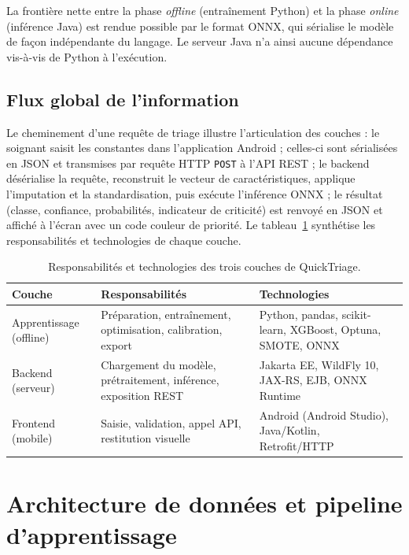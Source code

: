 \begin{infobox}
La frontière nette entre la phase \textit{offline} (entraînement Python) et la phase
\textit{online} (inférence Java) est rendue possible par le format ONNX, qui sérialise le
modèle de façon indépendante du langage. Le serveur Java n'a ainsi aucune dépendance vis-à-vis
de Python à l'exécution.
\end{infobox}

\subsection{Flux global de l'information}
Le cheminement d'une requête de triage illustre l'articulation des couches : le soignant
saisit les constantes dans l'application Android ; celles-ci sont sérialisées en JSON et
transmises par requête HTTP \texttt{POST} à l'API REST ; le backend désérialise la requête,
reconstruit le vecteur de caractéristiques, applique l'imputation et la standardisation, puis
exécute l'inférence ONNX ; le résultat (classe, confiance, probabilités, indicateur de
criticité) est renvoyé en JSON et affiché à l'écran avec un code couleur de priorité. Le
tableau~\ref{tab:couches} synthétise les responsabilités et technologies de chaque couche.

\begin{table}[h]
\centering
\renewcommand{\arraystretch}{1.4}
\begin{tabular}{p{3cm} p{5.5cm} p{5cm}}
\toprule
\textbf{Couche} & \textbf{Responsabilités} & \textbf{Technologies} \\
\midrule
Apprentissage (offline) & Préparation, entraînement, optimisation, calibration, export &
Python, pandas, scikit-learn, XGBoost, Optuna, SMOTE, ONNX \\
Backend (serveur) & Chargement du modèle, prétraitement, inférence, exposition REST &
Jakarta EE, WildFly 10, JAX-RS, EJB, ONNX Runtime \\
Frontend (mobile) & Saisie, validation, appel API, restitution visuelle &
Android (Android Studio), Java/Kotlin, Retrofit/HTTP \\
\bottomrule
\end{tabular}
\caption{Responsabilités et technologies des trois couches de QuickTriage.}
\label{tab:couches}
\end{table}

\section{Architecture de données et pipeline d'apprentissage}

